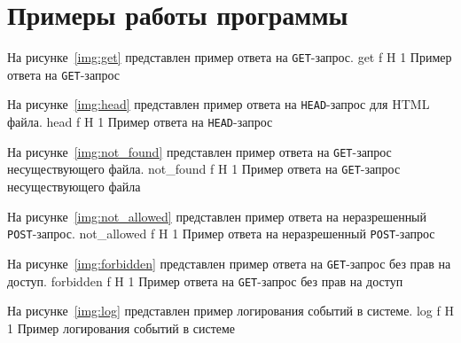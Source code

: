 \section{Примеры работы программы}

На рисунке~\ref{img:get} представлен пример ответа на \texttt{GET}-запрос.
	{get}
	{f}
	{H}
	{1\textwidth}
	{Пример ответа на \texttt{GET}-запрос}

На рисунке~\ref{img:head} представлен пример ответа на \texttt{HEAD}-запрос для HTML файла.
	{head}
	{f}
	{H}
	{1\textwidth}
	{Пример ответа на \texttt{HEAD}-запрос}

\clearpage
На рисунке~\ref{img:not_found} представлен пример ответа на \texttt{GET}-запрос несуществующего файла.
	{not_found}
	{f}
	{H}
	{1\textwidth}
	{Пример ответа на \texttt{GET}-запрос несуществующего файла}

На рисунке~\ref{img:not_allowed} представлен пример ответа на неразрешенный \texttt{POST}-запрос.
	{not_allowed}
	{f}
	{H}
	{1\textwidth}
	{Пример ответа на неразрешенный \texttt{POST}-запрос}

\clearpage
На рисунке~\ref{img:forbidden} представлен пример ответа на \texttt{GET}-запрос без прав на доступ.
	{forbidden}
	{f}
	{H}
	{1\textwidth}
	{Пример ответа на \texttt{GET}-запрос без прав на доступ}

На рисунке~\ref{img:log} представлен пример логирования событий в системе.
	{log}
	{f}
	{H}
	{1\textwidth}
	{Пример логирования событий в системе}